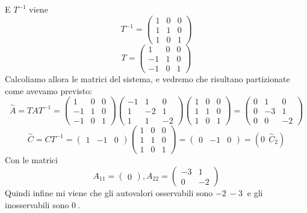\documentclass{article}
\begin{document}
E $T^{-1}$ viene \[ 
T^{-1} = \left(\begin{matrix}1 & 0 & 0\\1 & 1 & 0\\1 & 0 & 1\end{matrix}\right) \]
\[ 
T = \left(\begin{matrix}1 & 0 & 0\\-1 & 1 & 0\\-1 & 0 & 1\end{matrix}\right) \]Calcoliamo allora le matrici del sistema, e vedremo che risultano partizionate come avevamo previsto:
\[ 
\overset{\sim}{A} = T A  T^{-1} = \left(\begin{matrix}1 & 0 & 0\\-1 & 1 & 0\\-1 & 0 & 1\end{matrix}\right)\left(\begin{matrix}-1 & 1 & 0\\1 & -2 & 1\\1 & 1 & -2\end{matrix}\right)\left(\begin{matrix}1 & 0 & 0\\1 & 1 & 0\\1 & 0 & 1\end{matrix}\right) = \left(\begin{matrix}0 & 1 & 0\\0 & -3 & 1\\0 & 0 & -2\end{matrix}\right) \]
\[ 
\overset{\sim}{C} = CT^{-1} = \left(\begin{matrix}1 & -1 & 0\end{matrix}\right)\left(\begin{matrix}1 & 0 & 0\\1 & 1 & 0\\1 & 0 & 1\end{matrix}\right) = \left(\begin{matrix}0 & -1 & 0\end{matrix}\right) = ( 0\ \ \overset{\sim}{C}_2) \]
Con le matrici \[ A_{11} = \left(\begin{matrix}0\end{matrix}\right) , A_{22} = \left(\begin{matrix}-3 & 1\\0 & -2\end{matrix}\right) \]Quindi infine mi viene che gli autovalori osservabili sono $ -2\ -3\  $ e gli inosservabili sono $ 0\  $.
\end{document}
